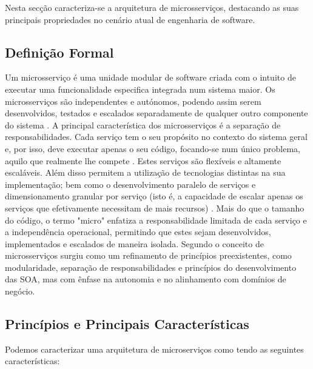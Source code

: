 Nesta secção caracteriza-se a arquitetura de microsserviços, destacando as suas principais propriedades no cenário atual de engenharia de software.

\subsection{Definição Formal}

Um microsserviço é uma unidade modular de software criada com o intuito de executar uma funcionalidade especifica integrada num sistema maior. Os microsserviços são independentes e autónomos, podendo assim serem desenvolvidos, testados e escalados separadamente de qualquer outro componente do sistema \cite{Jamshidi2018}. A principal característica dos microsserviços é a separação de responsabilidades. Cada serviço tem o seu propósito no contexto do sistema geral e, por isso, deve executar apenas o seu código, focando-se num único problema, aquilo que realmente lhe compete \cite{Newman2015}. Estes serviços são flexíveis e altamente escaláveis. Além disso permitem a utilização de tecnologias distintas na sua implementação; bem como o desenvolvimento paralelo de serviços e dimensionamento granular por serviço (isto é, a capacidade de escalar apenas os serviços que efetivamente necessitam de mais recursos) \cite{Lewis2014}. Mais do que o tamanho do código, o termo "micro" enfatiza a responsabilidade limitada de cada serviço e a independência operacional, permitindo que estes sejam desenvolvidos, implementados e escalados de maneira isolada. Segundo \cite{Dragoni2017} o conceito de microsserviços surgiu como um refinamento de princípios preexistentes, como modularidade, separação de responsabilidades e princípios do desenvolvimento das SOA, mas com ênfase na autonomia e no alinhamento com domínios de negócio.


\subsection{Princípios e Principais Características}

Podemos caracterizar uma arquitetura de microserviços como tendo as seguintes características:

